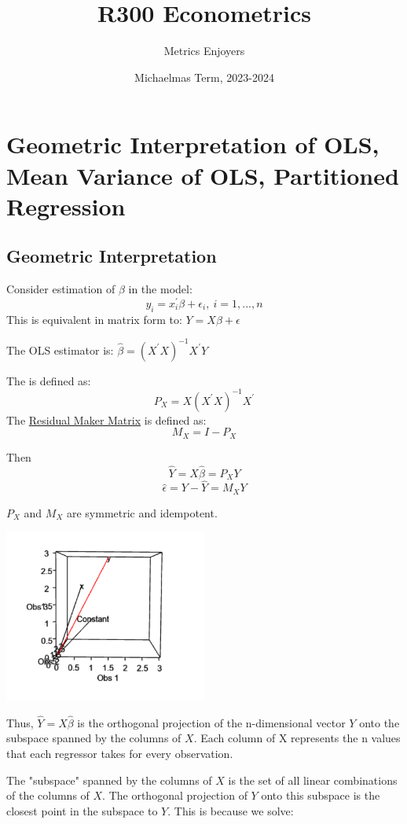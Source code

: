 \documentclass[DIV=14,titlepage=false]{scrreprt}
\title{%
R300 Econometrics}
\author{Metrics Enjoyers}
\date{Michaelmas Term, 2023-2024}
\begin{document}
\chapter{Geometric Interpretation of OLS, Mean Variance of OLS, Partitioned Regression}
\section{Geometric Interpretation}
Consider estimation of \(\beta\) in the model:
\[y_{i}=x^{'}_{i}\beta + \epsilon_{i}, \ i=1,...,n\]
This is equivalent in matrix form to: \(Y=X\beta+\epsilon\)

The OLS estimator is: \(\hat{\beta}=(X^{'}X)^{-1}X^{'}Y\)
\begin{definition}
  The \underline{} is defined as: \[P_X=X(X^{'}X)^{-1}X^{'}\]
  The \underline{Residual Maker Matrix} is defined as: \[M_X=I-P_X\]
\end{definition}

Then \[\hat{Y}=X\hat{\beta}=P_XY\] \[\hat{\epsilon}=Y-\hat{Y}=M_XY\]

\begin{claim}
  \(P_X\) and \(M_X\) are symmetric and idempotent.
\end{claim}

\begin{center}
  \includegraphics[width=0.5\textwidth]{./Images/OLS as projection.png}
\end{center}

Thus, \(\hat{Y}=X\hat{\beta}\) is the orthogonal projection of the n-dimensional vector \(Y\) onto the subspace spanned by the columns of \(X\).
Each column of X represents the n values that each regressor takes for every observation. 

The "subspace" spanned by the columns of \(X\) is the set of all linear combinations of the columns of \(X\). The orthogonal projection of \(Y\) onto this subspace is the closest point in the subspace to \(Y\). This is because we solve:
\end{document}
